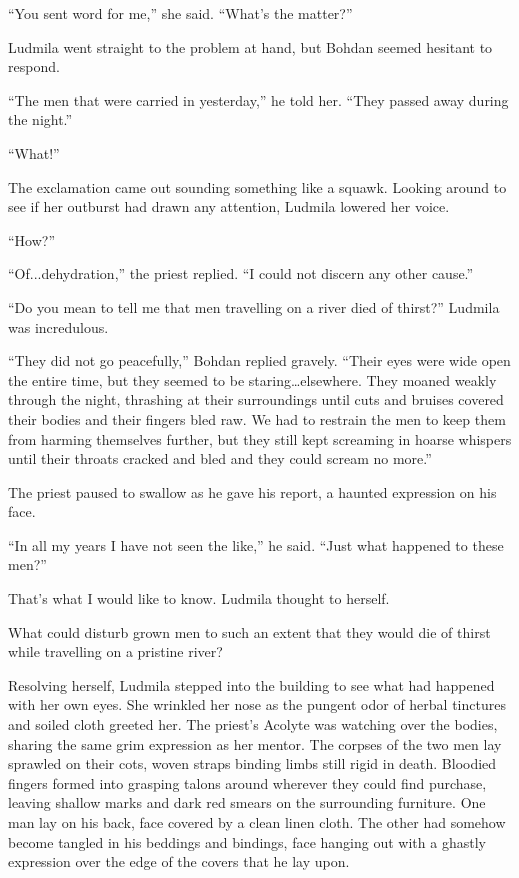  

“You sent word for me,” she said. “What’s the matter?”

 

Ludmila went straight to the problem at hand, but Bohdan seemed hesitant to respond.

 

“The men that were carried in yesterday,” he told her. “They passed away during the night.”

 

“What!”

 

The exclamation came out sounding something like a squawk. Looking around to see if her outburst had drawn any attention, Ludmila lowered her voice.

 

“How?”

 

“Of...dehydration,” the priest replied. “I could not discern any other cause.”

 

“Do you mean to tell me that men travelling on a river died of thirst?” Ludmila was incredulous.

 

“They did not go peacefully,” Bohdan replied gravely. “Their eyes were wide open the entire time, but they seemed to be staring…elsewhere. They moaned weakly through the night, thrashing at their surroundings until cuts and bruises covered their bodies and their fingers bled raw. We had to restrain the men to keep them from harming themselves further, but they still kept screaming in hoarse whispers until their throats cracked and bled and they could scream no more.”

 

The priest paused to swallow as he gave his report, a haunted expression on his face.

 

“In all my years I have not seen the like,” he said. “Just what happened to these men?”

 

That’s what I would like to know. Ludmila thought to herself.

 

What could disturb grown men to such an extent that they would die of thirst while travelling on a pristine river?

 

Resolving herself, Ludmila stepped into the building to see what had happened with her own eyes. She wrinkled her nose as the pungent odor of herbal tinctures and soiled cloth greeted her. The priest’s Acolyte was watching over the bodies, sharing the same grim expression as her mentor. The corpses of the two men lay sprawled on their cots, woven straps binding limbs still rigid in death. Bloodied fingers formed into grasping talons around wherever they could find purchase, leaving shallow marks and dark red smears on the surrounding furniture. One man lay on his back, face covered by a clean linen cloth. The other had somehow become tangled in his beddings and bindings, face hanging out with a ghastly expression over the edge of the covers that he lay upon.

